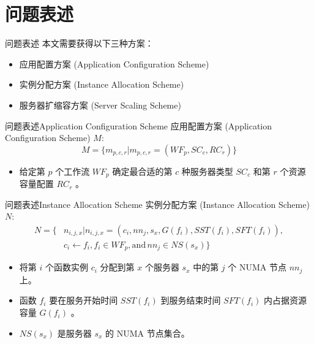 \documentclass[aspectratio=169]{beamer}
\begin{document}
\section{问题表述}

\begin{frame}{问题表述}
  本文需要获得以下三种方案：
  \begin{itemize}
    \item 应用配置方案 (Application Configuration Scheme)
    \item 实例分配方案 (Instance Allocation Scheme)
    \item 服务器扩缩容方案 (Server Scaling Scheme)
  \end{itemize}
\end{frame}

\begin{frame}{问题表述}{Application Configuration Scheme}
  应用配置方案 (Application Configuration Scheme) $M$:
  \begin{equation*}
    M = \{m_{p,c,r}|m_{p,c,r} = (WF_p,SC_c,RC_r)\}
  \end{equation*}
  \begin{itemize}
    \item 给定第 $p$ 个工作流 $WF_p$ 确定最合适的第 $c$ 种服务器类型 $SC_c$ 和第 $r$ 个资源容量配置 $RC_r$ 。
  \end{itemize}
\end{frame}

\begin{frame}{问题表述}{Instance Allocation Scheme}
  实例分配方案 (Instance Allocation Scheme) $N$:
  \begin{align*}
    N = \{&n_{i,j,x}|n_{i,j,x} = (c_i,nn_j,s_x,G(f_i),SST(f_i),SFT(f_i)), \\
    &c_i \leftarrow f_i,f_i \in WF_p, \text{and} \, nn_j \in NS(s_x)\}
  \end{align*}
  \begin{itemize}
    \item 将第 $i$ 个函数实例 $c_i$ 分配到第 $x$ 个服务器 $s_x$ 中的第 $j$ 个 NUMA 节点 $nn_j$ 上。
    \item 函数 $f_i$ 要在服务开始时间 $SST(f_i)$ 到服务结束时间 $SFT(f_i)$ 内占据资源容量 $G(f_i)$ 。
    \item $NS(s_x)$ 是服务器 $s_x$ 的 NUMA 节点集合。
  \end{itemize}
\end{frame}
\end{document}

